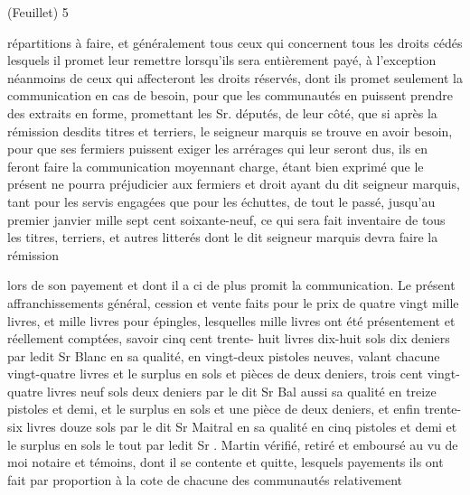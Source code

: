 \documentclass[a4paper,twoside,openany]{article}
\begin{document}
\begin{flushright}
(Feuillet) 5
\end{flushright}	
répartitions à faire, et généralement tous ceux qui
concernent tous les droits cédés lesquels il promet
leur remettre lorsqu'ils sera entièrement payé, à
l'exception néanmoins de ceux qui affecteront les
droits réservés, dont ils promet seulement la
communication en cas de besoin, pour que les
communautés en puissent prendre des extraits
en forme, promettant les Sr. députés, de leur côté,
que si après la rémission desdits titres et terriers,
le seigneur marquis se trouve en avoir besoin,
pour que ses fermiers puissent exiger les arrérages
qui leur seront dus, ils en feront faire la
communication moyennant charge, étant bien
exprimé que le présent ne pourra préjudicier aux
fermiers et droit ayant du dit seigneur marquis,
tant pour les \gls{servis} engagées que pour les \gls{échuttes},
de tout le passé, jusqu’au premier janvier mille
sept cent soixante-neuf, ce qui sera fait inventaire
de tous les titres, \gls{terriers}, et autres \gls{litterés} dont
le dit seigneur marquis devra faire la rémission


lors de son payement et dont il a ci de plus promit
la communication. Le présent affranchissements
général, cession et vente faits pour le prix de quatre
vingt mille livres, et mille livres pour épingles,
lesquelles mille livres ont été présentement et
réellement comptées, savoir cinq cent trente-
huit livres dix-huit sols dix deniers par ledit
Sr Blanc en sa qualité, en vingt-deux pistoles
neuves, valant chacune vingt-quatre livres et le
surplus en sols et pièces de deux deniers, trois cent
vingt-quatre livres neuf sols deux deniers par le
dit Sr Bal aussi sa qualité en treize pistoles
et demi, et le surplus en sols et une pièce de deux
deniers, et enfin trente-six livres douze sols par
le dit Sr Maitral  en sa qualité en cinq pistoles
et demi et le surplus en sols le tout par ledit Sr .
Martin vérifié, retiré et emboursé au vu de moi
notaire et témoins, dont il se contente et quitte,
lesquels payements ils ont fait par proportion à la
cote de chacune des communautés relativement

\end{document}
